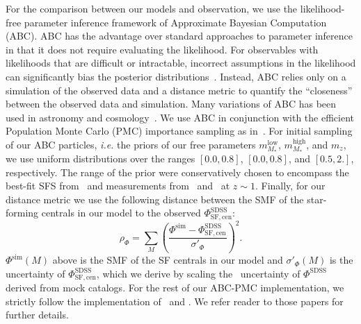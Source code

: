 \documentclass[12pt, letterpaper, preprint, tighten]{aastex62}
\newcommand{\beq}{\begin{equation}}
\newcommand{\eeq}{\end{equation}}
\begin{document}
For the comparison between our models and observation, we use the likelihood-free parameter 
inference framework of Approximate Bayesian Computation (ABC). ABC has the 
advantage over standard approaches to parameter inference in that it does not 
require evaluating the likelihood. For observables with likelihoods that are 
difficult or intractable, incorrect assumptions in the likelihood can significantly 
bias the posterior distributions~\citep[\emph{e.g.}][]{hahn2018}. Instead, 
ABC relies only on a simulation of the observed data and a distance metric to 
quantify the ``closeness'' between the observed data and simulation. Many variations 
of ABC has been used in astronomy and 
cosmology~\citep[\emph{e.g.}][]{cameron2012,weyant2013,ishida2015,alsing2018}. 
We use ABC in conjunction with the efficient Population Monte Carlo (PMC)
importance sampling as in~\citep{hahn2017b, hahn2017a}. For initial sampling 
of our ABC particles, \emph{i.e.} the priors of our free parameters 
$m^\mathrm{low}_{M_*}$, $m^\mathrm{high}_{M_*}$, and $m_z$, we use uniform 
distributions over the ranges $[0.0, 0.8]$, $[0.0, 0.8]$, and 
$[0.5, 2.]$, respectively. The range of the prior were conservatively chosen 
to encompass the best-fit SFS from~\cite{speagle2014} 
and measurements from~\cite{moustakas2013} and~\cite{lee2015} at $z \sim 1$. 
Finally, for our distance metric we use the following distance between 
the SMF of the star-forming centrals in our model to the observed 
$\Phi^\mathrm{SDSS}_\mathrm{SF,cen}$: 
\beq
\rho_\Phi = \sum\limits_{M} \left( \frac{\Phi^\mathrm{sim} - \Phi^\mathrm{SDSS}_\mathrm{SF,cen}}{\sigma'_\Phi}\right)^2.
\eeq
$\Phi^\mathrm{sim}(M)$ above is the SMF of the SF centrals in our model 
and $\sigma'_\Phi(M)$ is the uncertainty of $\Phi^\mathrm{SDSS}_\mathrm{SF,cen}$, 
which we derive by scaling the~\cite{li2009} uncertainty of $\Phi^\mathrm{SDSS}$ 
derived from mock catalogs. %
For the rest of our ABC-PMC implementation, we strictly follow the implementation 
of~\cite{hahn2017a} and \cite{hahn2017b}. We refer reader to those papers for 
further details.
\end{document}
